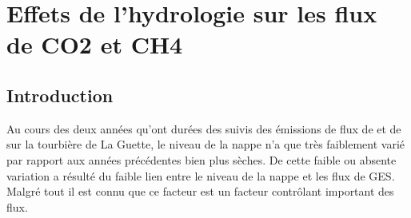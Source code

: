 \chapter{Effets de l'hydrologie sur les flux de CO2 et CH4}

\minitoc

\newpage

\section{Introduction}

Au cours des deux années qu'ont durées des suivis des émissions de flux de \coo et de \chh sur la tourbière de La Guette, le niveau de la nappe n'a que très faiblement varié par rapport aux années précédentes bien plus sèches.
De cette faible ou absente variation a résulté du faible lien entre le niveau de la nappe et les flux de GES.
Malgré tout il est connu que ce facteur est un facteur contrôlant important des flux.

